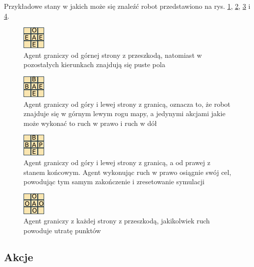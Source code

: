 Przykładowe stany w jakich może się znaleźć robot przedstawiono na rys. \ref{fig:grid1}, \ref{fig:grid2}, 
\ref{fig:grid3} i \ref{fig:grid4}.

\begin{figure}[H]
    \centering
    \includegraphics[scale=10]{grid1}
    \caption{Agent graniczy od górnej strony z przeszkodą, natomiast w pozostałych kierunkach znajdują się puste pola}
    \label{fig:grid1}
\end{figure}

\begin{figure}[H]
    \centering
    \includegraphics[scale=10]{grid2}
    \caption{Agent graniczy od góry i lewej strony z granicą, oznacza to, że robot znajduje się w górnym lewym rogu 
mapy, a jedynymi akcjami jakie może wykonać to ruch w prawo i ruch w dół}
    \label{fig:grid2}
\end{figure}

\begin{figure}[H]
    \centering
    \includegraphics[scale=10]{grid3}
    \caption{Agent graniczy od góry i lewej strony z granicą, a od prawej z stanem końcowym. Agent wykonując 
ruch w prawo osiągnie swój cel, powodując tym samym zakończenie i zresetowanie symulacji}
    \label{fig:grid3}
\end{figure}

\begin{figure}[H]
    \centering
    \includegraphics[scale=10]{grid4}
    \caption{Agent graniczy z każdej strony z przeszkodą, jakikolwiek ruch powoduje utratę punktów}
    \label{fig:grid4}
\end{figure}

\subsection{Akcje}
\label{subsec:akcje}

